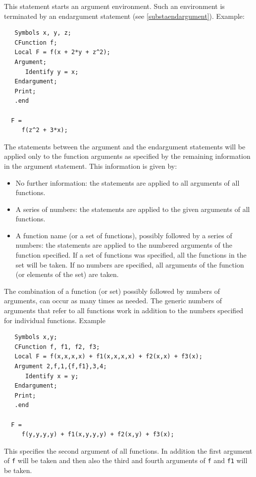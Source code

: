 \noindent This statement starts an argument 
environment. Such an environment is terminated 
by an endargument statement (see \ref{substaendargument}). Example:
\begin{verbatim}
   Symbols x, y, z;
   CFunction f;
   Local F = f(x + 2*y + z^2);
   Argument;
      Identify y = x;
   Endargument;
   Print;
   .end

  F =
     f(z^2 + 3*x);
\end{verbatim}
\vspace{4mm}
The statements 
between the argument and the endargument statements will 
be applied only to the function arguments as specified by the remaining 
information in the argument statement. This information is given by:
\begin{itemize}
\item   No further information: the statements are applied to all arguments 
of all functions.
\item   A series of numbers: the statements are applied to the given 
arguments of all functions.
\item   A function name (or a set of functions), possibly followed by a 
series of numbers: the statements are applied to the numbered arguments of 
the function specified. If a set of functions was specified, all the 
functions in the set will be taken. If no numbers are specified, all 
arguments of the function (or elements of the set) are taken.
\end{itemize}
The combination of a function (or set) possibly followed by numbers of 
arguments, can occur as many times as needed. The generic numbers of 
arguments that refer to all functions work in addition to the numbers 
specified for individual functions. Example\vspace{1mm}
\begin{verbatim}
   Symbols x,y;
   CFunction f, f1, f2, f3;
   Local F = f(x,x,x,x) + f1(x,x,x,x) + f2(x,x) + f3(x);
   Argument 2,f,1,{f,f1},3,4;
      Identify x = y; 
   Endargument;
   Print;
   .end

  F =
     f(y,y,y,y) + f1(x,y,y,y) + f2(x,y) + f3(x);
\end{verbatim}
This specifies the second argument of all functions. In addition the first 
argument of \verb:f: will be taken and then also the third and fourth 
arguments of \verb:f: and \verb:f1: will be taken. \vspace{4mm}

